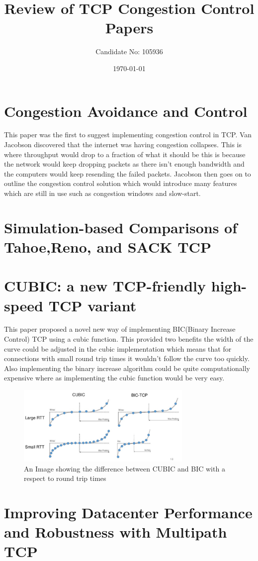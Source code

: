 \documentclass[a4paper,12pt]{scrartcl}
\title{Review of TCP Congestion Control Papers}
\author{Candidate No: 105936}
\date{\today}
\begin{document}
	
	\begin{titlepage}
		\maketitle
	\end{titlepage}
	
	\tableofcontents
	\newpage
	
	\section{Congestion Avoidance and Control\cite{JacobsonCongestAvoidanceControlArticle}}
	{
		This paper was the first to suggest implementing congestion control in TCP. Van Jacobson discovered that the internet was having congestion collapses. This is where throughput would drop to a fraction of what it should be this is because the network would keep dropping packets as there isn't enough bandwidth and the computers would keep resending the failed packets. Jacobson then goes on to outline the congestion control solution which would introduce many features which are still in use such as congestion windows and slow-start.
	}
	\section{Simulation-based Comparisons of Tahoe,Reno, and SACK TCP\cite{FallFloydTahoeRenoSack}}
	{
		
	}
	\section{CUBIC: a new TCP-friendly high-speed TCP variant\cite{HaRheeXuCubic}}
	{
		This paper proposed a novel new way of implementing BIC(Binary Increase Control) TCP using a cubic function. This provided two benefits the width of the curve could be adjusted in the cubic implementation which means that for connections with small round trip times it wouldn't follow the curve too quickly. Also implementing the binary increase algorithm could be quite computationally expensive where as implementing the cubic function would be very easy.
		\begin{figure}[h]
			\centering
			\includegraphics[width=0.75\textwidth]{BICVsCubicRTT}
			\caption{An Image showing the difference between CUBIC and BIC with a respect to round trip times\cite{deawookim2015}}
			\label{fig:BICVsCubicRTT}
		\end{figure}
	}
	\section{Improving Datacenter Performance and Robustness with Multipath TCP\cite{RaiciuBarrePluntkeGreenhalghWischikHandleyMultipathTCPArticle}}
	{
		
	}
	\newpage
	
	\printbibliography[heading=bibintoc,title=References]
\end{document}
